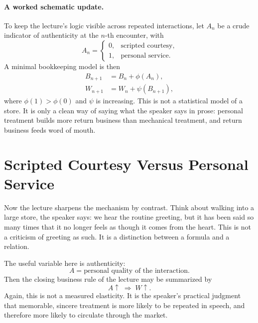 \paragraph{A worked schematic update.} To keep the lecture's logic visible across repeated interactions, let \(A_n\) be a crude indicator of authenticity at the \(n\)-th encounter, with
\[
A_n =
\begin{cases}
0, & \text{scripted courtesy},\\
1, & \text{personal service}.
\end{cases}
\]
A minimal bookkeeping model is then
\begin{align}
B_{n+1} &= B_n + \phi(A_n),\\
W_{n+1} &= W_n + \psi(B_{n+1}),
\end{align}
where \(\phi(1) > \phi(0)\) and \(\psi\) is increasing. This is not a statistical model of a store. It is only a clean way of saying what the speaker says in prose: personal treatment builds more return business than mechanical treatment, and return business feeds word of mouth.

\section{Scripted Courtesy Versus Personal Service}

Now the lecture sharpens the mechanism by contrast. Think about walking into a large store, the speaker says: we hear the routine greeting, but it has been said so many times that it no longer feels as though it comes from the heart. This is not a criticism of greeting as such. It is a distinction between a formula and a relation.

The useful variable here is authenticity:
\[
A = \text{personal quality of the interaction}.
\]
Then the closing business rule of the lecture may be summarized by
\begin{equation}
A \uparrow \;\Rightarrow\; W \uparrow.
\end{equation}
Again, this is not a measured elasticity. It is the speaker's practical judgment that memorable, sincere treatment is more likely to be repeated in speech, and therefore more likely to circulate through the market.

\begin{figure}[h]
\centering
{}
\end{figure}

